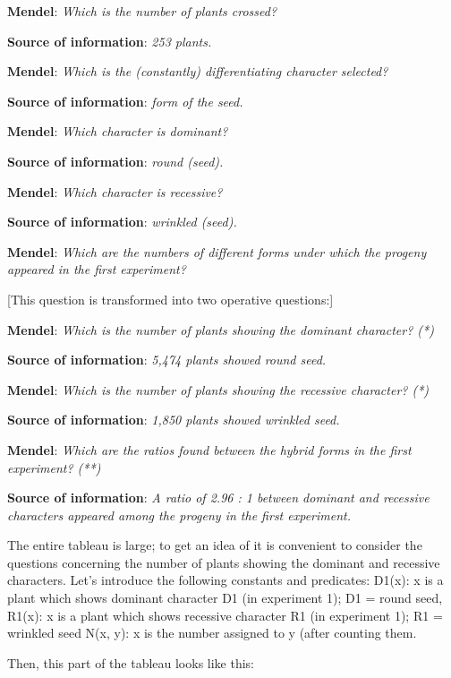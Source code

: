 \documentclass[a4paper,UKenglish]{lipics}
\begin{document}
\textbf{Mendel}: \emph{Which is the number of plants crossed?} 

\textbf{Source of information}: \emph{253 plants.} 

\textbf{Mendel}: \emph{Which is the (constantly) differentiating character selected?} 

\textbf{Source of information}: \emph{form of the seed.} 

\textbf{Mendel}: \emph{Which character is dominant?} 

\textbf{Source of information}: \emph{round (seed).}

\textbf{Mendel}: \emph{Which character is recessive?} 

\textbf{Source of information}: \emph{wrinkled (seed).}

\textbf{Mendel}: \emph{Which are the numbers of different forms under which the progeny appeared in the first experiment?} 

[This question is transformed into two operative questions:]

\textbf{Mendel}: \emph{Which is the number of plants showing the dominant character? (*)} 

\textbf{Source of information}: \emph{5,474 plants showed round seed.}

\textbf{Mendel}: \emph{Which is the number of plants showing the recessive character? (*)} 

\textbf{Source of information}: \emph{1,850 plants showed wrinkled seed.}

\textbf{Mendel}: \emph{Which are the ratios found between the hybrid forms in the first experiment? (**)} 

\textbf{Source of information}: \emph{A ratio of 2.96 : 1 between dominant and recessive characters appeared among the progeny in the first experiment.}


The entire tableau is large; to get an idea of it is convenient to consider the questions concerning the number of plants showing the dominant and recessive characters. Let’s introduce the following constants and predicates:
D1(x): x is a plant which shows dominant character D1 (in experiment 1); D1 = round seed,
R1(x): x is a plant which shows recessive character R1 (in experiment 1); R1 = wrinkled seed
N(x, y): x is the number assigned to y (after counting them.

Then, this part of the tableau looks like this:
	
\end{document}
